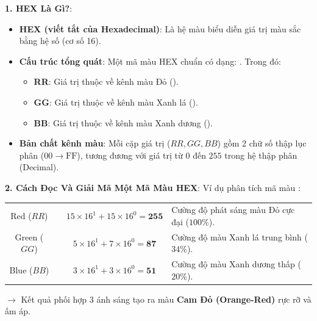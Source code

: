 \begin{conceptBox}
\textbf{1. HEX Là Gì?}:
\begin{itemize}[leftmargin=1.5em, itemsep=3pt, parsep=0pt]
    \item \textbf{HEX (viết tắt của Hexadecimal)}: Là hệ màu biểu diễn giá trị màu sắc bằng hệ số  (cơ số 16).
    \item \textbf{Cấu trúc tổng quát}: Một mã màu HEX chuẩn có dạng: . Trong đó:
    \begin{itemize}[leftmargin=1.2em, itemsep=2pt]
        \item \textbf{RR}: Giá trị thuộc về kênh màu Đỏ ().
        \item \textbf{GG}: Giá trị thuộc về kênh màu Xanh lá ().
        \item \textbf{BB}: Giá trị thuộc về kênh màu Xanh dương ().
    \end{itemize}
    \item \textbf{Bản chất kênh màu}: Mỗi cặp giá trị ($RR, GG, BB$) gồm 2 chữ số thập lục phân ($00 \rightarrow \text{FF}$), tương đương với giá trị từ $0$ đến $255$ trong hệ thập phân (Decimal).
\end{itemize}

\textbf{2. Cách Đọc Và Giải Mã Một Mã Màu HEX}:
Ví dụ phân tích mã màu :
\begin{center}
\small\sffamily
\begin{tabular}{|c|c|c|L{5.5cm}|}
\hline
{}  &  &  &  \\
\hline
Red ($RR$) &  & $15 \times 16^1 + 15 \times 16^0 = \mathbf{255}$ & Cường độ phát sáng màu Đỏ cực đại ($100\%$). \\
\hline
Green ($GG$) &  & $5 \times 16^1 + 7 \times 16^0 = \mathbf{87}$ & Cường độ màu Xanh lá trung bình ($34\%$). \\
\hline
Blue ($BB$) &  & $3 \times 16^1 + 3 \times 16^0 = \mathbf{51}$ & Cường độ màu Xanh dương thấp ($20\%$). \\
\hline
\end{tabular}
\end{center}
$\rightarrow$ Kết quả phối hợp 3 ánh sáng tạo ra màu \textbf{Cam Đỏ (Orange-Red)} rực rỡ và ấm áp.
\end{conceptBox}


